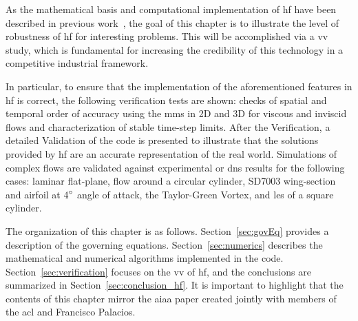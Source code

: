 As the mathematical basis and computational implementation of \gls{hf} have been described in previous work~\cite{castonguay2011}, the goal of this chapter is to illustrate the level of robustness of \gls{hf} for interesting problems. This will be accomplished via a \gls{vv} study, which is fundamental for increasing the credibility of this technology in a competitive industrial framework.

In particular, to ensure that the implementation of the aforementioned features in \gls{hf} is correct, the following verification tests are shown: checks of spatial and temporal order of accuracy using the \gls{mms} in 2D and 3D for viscous and inviscid flows and characterization of stable time-step limits. After the Verification, a detailed Validation of the code is presented to illustrate that the solutions provided by \gls{hf} are an accurate representation of the real world. Simulations of complex flows are validated against experimental or \gls{dns} results for the following cases: laminar flat-plane, flow around a circular cylinder, SD7003 wing-section and airfoil at 4$^{\circ}$ angle of attack, the Taylor-Green Vortex, and \gls{les} of a square cylinder.

The organization of this chapter is as follows. Section~\ref{sec:govEq} provides a description of the governing equations. Section~\ref{sec:numerics} describes the mathematical and numerical algorithms implemented in the code. Section~\ref{sec:verification} focuses on the \gls{vv} of \gls{hf}, and the conclusions are summarized in Section~\ref{sec:conclusion_hf}. It is important to highlight that the contents of this chapter mirror the \gls{aiaa} paper\cite{lopez2014verification} created jointly with members of the \gls{acl} and Francisco Palacios.
